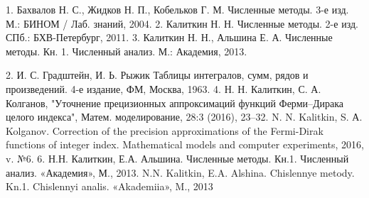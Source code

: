 1. Бахвалов Н. С., Жидков Н. П., Кобельков Г. М. Численные методы. 3-е изд. М.: БИНОМ / Лаб. знаний, 2004.
2. Калиткин Н. Н. Численные методы. 2-е изд. СПб.: БХВ-Петербург, 2011.
3. Калиткин Н. Н., Альшина Е. А. Численные методы. Кн. 1. Численный анализ. М.: Академия, 2013.


2. И. С. Градштейн, И. Ь. Рыжик Таблицы интегралов, сумм, рядов и произведений. 4-е издание, ФМ,
Москва, 1963.
4. Н. Н. Калиткин, С. А. Колганов, "Уточнение прецизионных аппроксимаций функций Ферми–Дирака
целого индекса", Матем. моделирование, 28:3 (2016), 23–32.
N. N. Kalitkin, S. А. Kolganov. Correction of the precision approximations of the Fermi-Dirak functions of integer index. Mathematical models and computer experiments, 2016, v. №6.
6. Н.Н. Калиткин, Е.А. Альшина. Численные методы. Кн.1. Численный анализ. «Академия», М., 2013.
N.N. Kalitkin, E.A. Alshina. Chislennye metody. Kn.1. Chislennyi analis. «Akademiia», M., 2013
